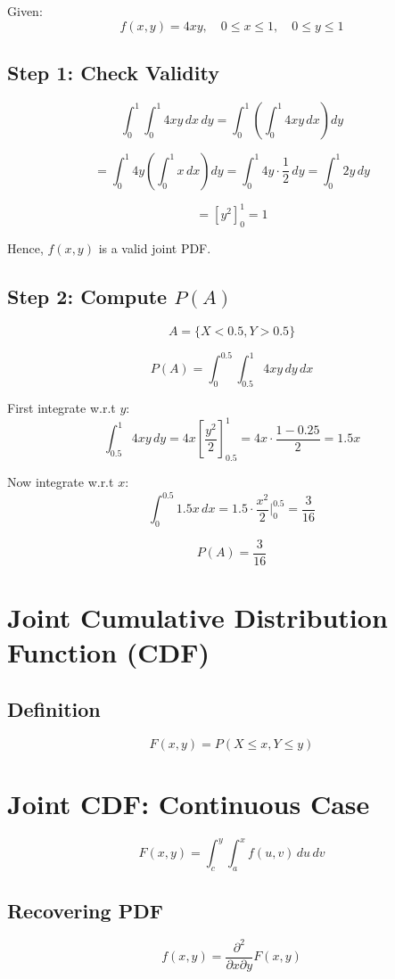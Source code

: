 \documentclass[12pt]{article}
\begin{document}
Given:
\[
f(x,y) = 4xy, \quad 0 \leq x \leq 1, \quad 0 \leq y \leq 1
\]

\subsection{Step 1: Check Validity}
\[
\int_0^1 \int_0^1 4xy \, dx\, dy
= \int_0^1 \left( \int_0^1 4xy\,dx \right) dy
\]

\[
= \int_0^1 4y \left( \int_0^1 x\,dx \right) dy
= \int_0^1 4y \cdot \frac{1}{2} \, dy
= \int_0^1 2y\,dy
\]

\[
= \left[ y^2 \right]_0^1 = 1
\]

Hence, $f(x,y)$ is a valid joint PDF.

\subsection{Step 2: Compute $P(A)$}

\[
A = \{X < 0.5, Y > 0.5\}
\]

\[
P(A) = \int_0^{0.5} \int_{0.5}^{1} 4xy\, dy\, dx
\]

First integrate w.r.t $y$:
\[
\int_{0.5}^{1} 4xy\,dy = 4x \left[\frac{y^2}{2}\right]_{0.5}^{1}
= 4x \cdot \frac{1 - 0.25}{2}
= 1.5x
\]

Now integrate w.r.t $x$:
\[
\int_0^{0.5} 1.5x\,dx = 1.5 \cdot \frac{x^2}{2} \Big|_0^{0.5}
= \frac{3}{16}
\]

\[
\boxed{P(A) = \frac{3}{16}}
\]

\section{Joint Cumulative Distribution Function (CDF)}

\subsection{Definition}
\[
F(x,y) = P(X \leq x, Y \leq y)
\]

\section{Joint CDF: Continuous Case}

\[
F(x,y) = \int_c^y \int_a^x f(u,v)\,du\,dv
\]

\subsection{Recovering PDF}
\[
f(x,y) = \frac{\partial^2}{\partial x \partial y} F(x,y)
\]
\end{document}
